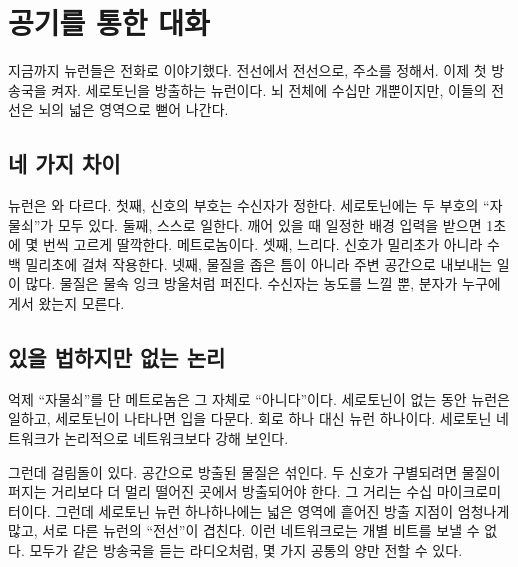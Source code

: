 \chapter{공기를 통한 대화}


지금까지 뉴런들은 전화로 이야기했다. 전선에서 전선으로, 주소를 정해서. 이제 첫 방송국을 켜자. 세로토닌을 방출하는  뉴런이다. 뇌 전체에 수십만 개뿐이지만, 이들의 전선은 뇌의 넓은 영역으로 뻗어 나간다.

\section*{네 가지 차이}

 뉴런은 와 다르다. 첫째, 신호의 부호는 수신자가 정한다. 세로토닌에는 두 부호의 “자물쇠”가 모두 있다. 둘째, 스스로 일한다. 깨어 있을 때 일정한 배경 입력을 받으면 1초에 몇 번씩 고르게 딸깍한다. 메트로놈이다. 셋째, 느리다. 신호가 밀리초가 아니라 수백 밀리초에 걸쳐 작용한다. 넷째, 물질을 좁은 틈이 아니라 주변 공간으로 내보내는 일이 많다. 물질은 물속 잉크 방울처럼 퍼진다. 수신자는 농도를 느낄 뿐, 분자가 누구에게서 왔는지 모른다.

\section*{있을 법하지만 없는 논리}

억제 “자물쇠”를 단 메트로놈은 그 자체로 “아니다”이다. 세로토닌이 없는 동안 뉴런은 일하고, 세로토닌이 나타나면 입을 다문다. 회로 하나 대신 뉴런 하나이다. 세로토닌 네트워크가 논리적으로  네트워크보다 강해 보인다.

그런데 걸림돌이 있다. 공간으로 방출된 물질은 섞인다. 두 신호가 구별되려면 물질이 퍼지는 거리보다 더 멀리 떨어진 곳에서 방출되어야 한다. 그 거리는 수십 마이크로미터이다. 그런데 세로토닌 뉴런 하나하나에는 넓은 영역에 흩어진 방출 지점이 엄청나게 많고, 서로 다른 뉴런의 “전선”이 겹친다. 이런 네트워크로는 개별 비트를 보낼 수 없다. 모두가 같은 방송국을 듣는 라디오처럼, 몇 가지 공통의 양만 전할 수 있다.



